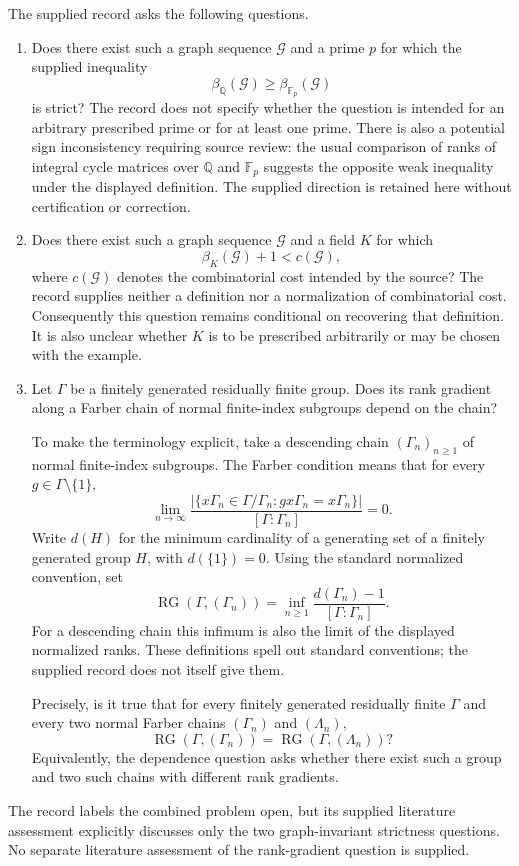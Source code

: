 \documentclass[11pt]{article}
\newcommand{\Q}{\mathbb{Q}}
\newcommand{\F}{\mathbb{F}}
\begin{document}
The supplied record asks the following questions.
\begin{enumerate}
\item Does there exist such a graph sequence \(\mathcal G\) and a prime \(p\) for which the supplied inequality
\[
\beta_{\Q}(\mathcal G)\geq\beta_{\F_p}(\mathcal G)
\]
is strict? The record does not specify whether the question is intended for an arbitrary prescribed prime or for at least one prime. There is also a potential sign inconsistency requiring source review: the usual comparison of ranks of integral cycle matrices over \(\Q\) and \(\F_p\) suggests the opposite weak inequality under the displayed definition. The supplied direction is retained here without certification or correction.
\item Does there exist such a graph sequence \(\mathcal G\) and a field \(K\) for which
\[
\beta_K(\mathcal G)+1<c(\mathcal G),
\]
where \(c(\mathcal G)\) denotes the combinatorial cost intended by the source? The record supplies neither a definition nor a normalization of combinatorial cost. Consequently this question remains conditional on recovering that definition. It is also unclear whether \(K\) is to be prescribed arbitrarily or may be chosen with the example.
\item Let \(\Gamma\) be a finitely generated residually finite group. Does its rank gradient along a Farber chain of normal finite-index subgroups depend on the chain?

To make the terminology explicit, take a descending chain \((\Gamma_n)_{n\geq 1}\) of normal finite-index subgroups. The Farber condition means that for every \(g\in\Gamma\setminus\{1\}\),
\[
\lim_{n\to\infty}
\frac{|\{x\Gamma_n\in\Gamma/\Gamma_n:gx\Gamma_n=x\Gamma_n\}|}
{[\Gamma:\Gamma_n]}=0.
\]
Write \(d(H)\) for the minimum cardinality of a generating set of a finitely generated group \(H\), with \(d(\{1\})=0\). Using the standard normalized convention, set
\[
\operatorname{RG}(\Gamma,(\Gamma_n))
=\inf_{n\geq 1}\frac{d(\Gamma_n)-1}{[\Gamma:\Gamma_n]}.
\]
For a descending chain this infimum is also the limit of the displayed normalized ranks. These definitions spell out standard conventions; the supplied record does not itself give them.

Precisely, is it true that for every finitely generated residually finite \(\Gamma\) and every two normal Farber chains \((\Gamma_n)\) and \((\Lambda_n)\),
\[
\operatorname{RG}(\Gamma,(\Gamma_n))
=\operatorname{RG}(\Gamma,(\Lambda_n))?
\]
Equivalently, the dependence question asks whether there exist such a group and two such chains with different rank gradients.
\end{enumerate}
The record labels the combined problem open, but its supplied literature assessment explicitly discusses only the two graph-invariant strictness questions. No separate literature assessment of the rank-gradient question is supplied.
\end{document}
